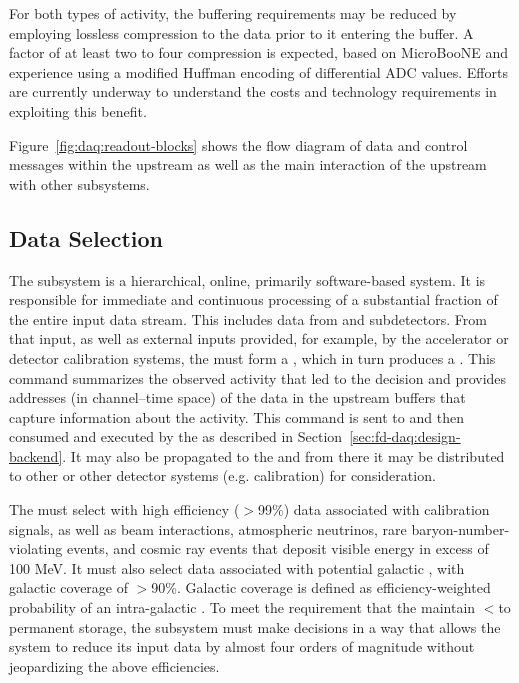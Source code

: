\begin{itemize}
For both types of activity, the buffering requirements may be reduced by
employing lossless compression to the data prior to it entering the buffer. A
factor of at least two to four compression is expected, based on MicroBooNE
and  experience using a modified Huffman encoding of
differential ADC values.  Efforts are currently underway to understand the
costs and technology requirements in exploiting this benefit.

\end{itemize}

Figure~\ref{fig:daq:readout-blocks} shows the flow diagram of data and control messages within the upstream  as well as the main interaction of the upstream  with other subsystems.

\subsection{Data Selection}
\label{sec:sp-daq:design-data-selection}

The  subsystem is a hierarchical, online, primarily
software-based system. It is responsible for immediate and continuous processing of a substantial fraction of the entire input data stream. 
This includes data from  and  subdetectors.
From that input, as well as external inputs provided, for example, by
the accelerator or detector calibration systems, the  must form a ,
which in turn produces a .
This command summarizes the observed activity that led to the decision
and provides addresses (in channel--time space) of the data in the
upstream  buffers that capture information about the activity.
This command is sent to and then consumed and executed by the  as described in Section~\ref{sec:fd-daq:design-backend}. 
It may also be propagated to the  and from there it may be
distributed to other  or other detector systems
(e.g. calibration) for consideration.

The  must select with high efficiency ($>$99\%) data associated with calibration
signals, as well as beam interactions,
atmospheric neutrinos, rare baryon-number-violating events, and cosmic
ray events that deposit visible energy in excess of 100 MeV. 
It must also select data associated with potential galactic , with galactic coverage
of $>$90\%. Galactic coverage is defined as efficiency-weighted probability of an intra-galactic . 
To meet the requirement that the   maintain
$<$\offsitepbpy to permanent storage, the 
subsystem must make  decisions in a way that allows the  
system to reduce its input data by almost four orders of magnitude
without jeopardizing the above efficiencies.


